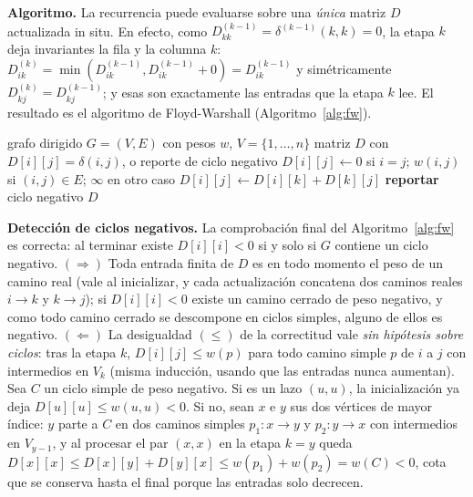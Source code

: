 \documentclass[11pt]{article}
\begin{document}
\textbf{Algoritmo.} La recurrencia puede evaluarse sobre una \emph{única}
matriz $D$ actualizada in situ. En efecto, como
$D^{(k-1)}_{kk}=\delta^{(k-1)}(k,k)=0$, la etapa $k$ deja invariantes la
fila y la columna $k$:
$D^{(k)}_{ik}=\min(D^{(k-1)}_{ik},D^{(k-1)}_{ik}+0)=D^{(k-1)}_{ik}$ y
simétricamente $D^{(k)}_{kj}=D^{(k-1)}_{kj}$; y esas son exactamente las
entradas que la etapa $k$ lee. El resultado es el algoritmo de
Floyd-Warshall (Algoritmo~\ref{alg:fw}).

\begin{algorithm}[ht]
\caption{\textsc{FloydWarshall}$(G,w)$}\label{alg:fw}
\begin{algorithmic}[1]
\Require grafo dirigido $G=(V,E)$ con pesos $w$, $V=\{1,\dots,n\}$
\Ensure matriz $D$ con $D[i][j]=\delta(i,j)$, o reporte de ciclo negativo
\State $D[i][j]\gets 0$ si $i=j$;\; $w(i,j)$ si $(i,j)\in E$;\; $\infty$ en otro caso 
        \State $D[i][j]\gets D[i][k]+D[k][j]$
      \EndIf
    \EndFor
  \EndFor
\EndFor
{}
  \State \textbf{reportar} ciclo negativo
\EndIf
\State \Return $D$
\end{algorithmic}
\end{algorithm}

\textbf{Detección de ciclos negativos.} La comprobación final del
Algoritmo~\ref{alg:fw} es correcta: al terminar existe $D[i][i]<0$ si y solo
si $G$ contiene un ciclo negativo. $(\Rightarrow)$ Toda entrada finita de
$D$ es en todo momento el peso de un camino real (vale al inicializar, y
cada actualización concatena dos caminos reales $i\to k$ y $k\to j$); si
$D[i][i]<0$ existe un camino cerrado de peso negativo, y como todo camino
cerrado se descompone en ciclos simples, alguno de ellos es negativo.
$(\Leftarrow)$ La desigualdad $(\le)$ de la correctitud vale \emph{sin
hipótesis sobre ciclos}: tras la etapa $k$, $D[i][j]\le w(p)$ para todo
camino simple $p$ de $i$ a $j$ con intermedios en $V_k$ (misma inducción,
usando que las entradas nunca aumentan). Sea $C$ un ciclo simple de peso
negativo. Si es un lazo $(u,u)$, la inicialización ya deja
$D[u][u]\le w(u,u)<0$. Si no, sean $x$ e $y$ sus dos vértices de mayor
índice: $y$ parte a $C$ en dos caminos simples $p_1\colon x\to y$ y
$p_2\colon y\to x$ con intermedios en $V_{y-1}$, y al procesar el par
$(x,x)$ en la etapa $k=y$ queda
$D[x][x]\le D[x][y]+D[y][x]\le w(p_1)+w(p_2)=w(C)<0$, cota que se conserva
hasta el final porque las entradas solo decrecen.
\end{document}
